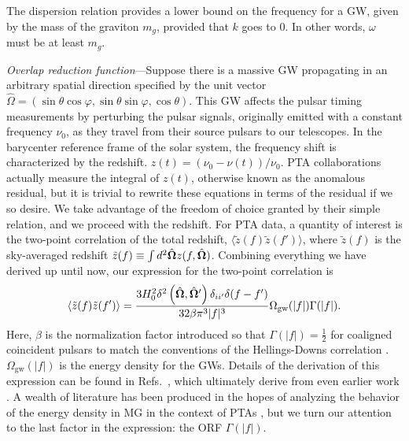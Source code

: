 \documentclass[prd,twocolumn,aps,psfig,nofootinbib,nobibnotes,superscriptaddress,preprintnumbers,times]{revtex4-2}
\begin{document}
The dispersion relation provides a lower bound on the frequency for a GW, given by the mass of the graviton $m_g$, provided that $k$ goes to 0. In other words, $\omega$ must be at least $m_g$. 

\textit{Overlap reduction function}---Suppose there is a massive GW propagating in an arbitrary spatial direction specified by the unit vector $\hat{\Omega} = (                     \sin\theta \cos\varphi,
                        \sin\theta \sin\varphi,
                        \cos\theta)$.
This GW affects the pulsar timing measurements by perturbing the pulsar signals, originally emitted with a constant frequency $\nu_0$, as they travel from their source pulsars to our telescopes. In the barycenter reference frame of the solar system, the frequency shift is characterized by the redshift.
$z(t) = (\nu_0 - \nu(t))/\nu_0$.
PTA collaborations actually measure the integral of $z(t)$, otherwise known as the anomalous residual, but it is trivial to rewrite these equations in terms of the residual if we so desire. We take advantage of the freedom of choice granted by their simple relation, and we proceed with the redshift. For PTA data, a quantity of interest is the two-point correlation of the total redshift, $\langle \tilde{z}(f) \tilde{z}(f') \rangle$, where $\tilde{z}(f)$ is the sky-averaged redshift $\tilde{z}(f) \equiv \int d^2\hat{\bf \Omega} z(f, \hat{\bf \Omega})$. Combining everything we have derived up until now, our expression for the two-point correlation is
\begin{equation}\label{eqn:two_point_z}
    \langle \tilde{z}(f) \tilde{z}(f') \rangle = \frac{3H_0^2\delta^2\left(\hat{\bf \Omega} , \hat{\bf \Omega}'\right)\delta_{ii'}\delta(f - f')}{32 \beta \pi^3|f|^3}\Omega_{\text{gw}}(|f|) \Gamma(|f|).
\end{equation}
Here, $\beta$ is the normalization factor introduced so that $\Gamma(|f|) = \frac{1}{2}$ for coaligned coincident pulsars to match the conventions of the Hellings-Downs correlation \cite{Romano:2023zhb}. $\Omega_{\text{gw}}(|f|)$ is the energy density for the GWs. Details of the derivation of this expression can be found in Refs.\ \cite{Anholm:2008wy, Liang:2021bct}, which ultimately derive from even earlier work \cite{Detweiler:1979wn, Estabrook:1975jtn, Kaufmann:1970}. A wealth of literature has been produced in the hopes of analyzing the behavior of the energy density in MG in the context of PTAs \cite{Choi:2023tun, Wu:2023rib, Kenjale:2024rsc, He:2021bqm}, but we turn our attention to the last factor in the expression: the ORF $\Gamma(|f|)$. 
\end{document}
